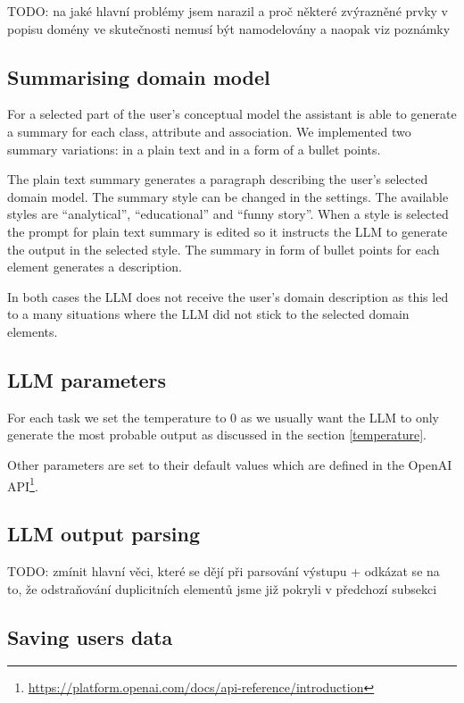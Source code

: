 TODO: na jaké hlavní problémy jsem narazil a proč některé zvýrazněné prvky v popisu domény ve skutečnosti nemusí být namodelovány a naopak viz poznámky \\


\subsection{Summarising domain model}
\label{summarising_domain_model}

For a selected part of the user's conceptual model the assistant is able to generate a summary for each class, attribute and association. We implemented two summary variations: in a plain text and in a form of a bullet points.

The plain text summary generates a paragraph describing the user's selected domain model. The summary style can be changed in the settings. The available styles are ``analytical'', ``educational'' and ``funny story''. When a style is selected the prompt for plain text summary is edited so it instructs the LLM to generate the output in the selected style. The summary in form of bullet points for each element generates a description.

In both cases the LLM does not receive the user's domain description as this led to a many situations where the LLM did not stick to the selected domain elements.


\subsection{LLM parameters}

For each task we set the temperature to $0$ as we usually want the LLM to only generate the most probable output as discussed in the section \ref{temperature}.

Other parameters are set to their default values which are defined in the OpenAI API\footnote{\url{https://platform.openai.com/docs/api-reference/introduction}}.


\subsection{LLM output parsing}

TODO: zmínit hlavní věci, které se dějí při parsování výstupu + odkázat se na to, že odstraňování duplicitních elementů jsme již pokryli v předchozí subsekci \\


\subsection{Saving users data}

